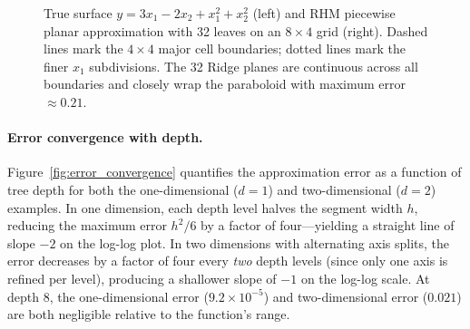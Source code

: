 \documentclass[11pt,a4paper]{article}
\begin{document}
\begin{figure}[ht]
\begin{minipage}[t]{0.48\textwidth}
\end{minipage}
\caption{True surface $y = 3x_1 - 2x_2 + x_1^2 + x_2^2$ (left) and RHM piecewise planar approximation with 32 leaves on an $8\!\times\!4$ grid (right). Dashed lines mark the $4\!\times\!4$ major cell boundaries; dotted lines mark the finer $x_1$ subdivisions. The 32 Ridge planes are continuous across all boundaries and closely wrap the paraboloid with maximum error $\approx 0.21$.}\label{fig:surface_comparison}
\end{figure}

\paragraph{Error convergence with depth.}
Figure~\ref{fig:error_convergence} quantifies the approximation error as a function of tree depth for both the one-dimensional ($d\!=\!1$) and two-dimensional ($d\!=\!2$) examples. In one dimension, each depth level halves the segment width $h$, reducing the maximum error $h^2/6$ by a factor of four---yielding a straight line of slope $-2$ on the log-log plot. In two dimensions with alternating axis splits, the error decreases by a factor of four every \emph{two} depth levels (since only one axis is refined per level), producing a shallower slope of $-1$ on the log-log scale. At depth 8, the one-dimensional error ($9.2 \times 10^{-5}$) and two-dimensional error ($0.021$) are both negligible relative to the function's range.
\end{document}
